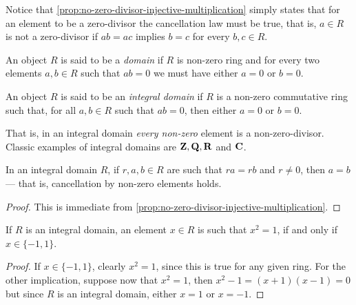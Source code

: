 %
\begin{remark}
    \label{rem:no-zero-divisor-is-cancellation-in-disguise}
    Notice that \cref{prop:no-zero-divisor-injective-multiplication} simply states
    that for an element to be a zero-divisor the cancellation law must be true,
    that is, \(a \in R\) is not a zero-divisor if \(a b = a c\) implies \(b = c\)
    for every \(b, c \in R\).
\end{remark}
%

%
\begin{definition}[Domain]
    \label{def:domain}
    An object \(R\) is said to be a \emph{domain} if \(R\) is non-zero ring and for
    every two elements \(a, b \in R\) such that \(a b = 0\) we must have either
    \(a = 0\) or \(b = 0\).
\end{definition}
%

%
\begin{definition}
    \label{def:integral-domain}
    An object \(R\) is said to be an \emph{integral domain} if \(R\) is a non-zero
    commutative ring such that, for all \(a, b \in R\) such that \(a b = 0\), then
    either \(a = 0\) or \(b = 0\).
\end{definition}
%

That is, in an integral domain \emph{every non-zero} element is a
non-zero-divisor. Classic examples of integral domains are \(\mathbf{Z}, \mathbf{Q}, \mathbf{R}\) and
\(\mathbf{C}\).

%
\begin{corollary}
    \label{cor:cancellation-integral-domain}
    In an integral domain \(R\), if \(r, a, b \in R\) are such that \(r a = r b\)
    and \(r \neq 0\), then \(a = b\) --- that is, cancellation by non-zero elements
    holds.
\end{corollary}
%

%
\begin{proof}
    This is immediate from \cref{prop:no-zero-divisor-injective-multiplication}.
\end{proof}
%


%
\begin{corollary}
    \label{cor:idempotent-in-integral-domain}
    If \(R\) is an integral domain, an element \(x \in R\) is such that \(x^2 = 1\),
    if and only if \(x \in \{-1, 1\}\).
\end{corollary}
%

%
\begin{proof}
    If \(x \in \{-1, 1\}\), clearly \(x^2 = 1\), since this is true for any given
    ring. For the other implication, suppose now that \(x^2 = 1\), then \(x^2 - 1 =
    (x + 1) (x - 1) = 0\) but since \(R\) is an integral domain, either \(x = 1\) or
    \(x = -1\).
\end{proof}
%

